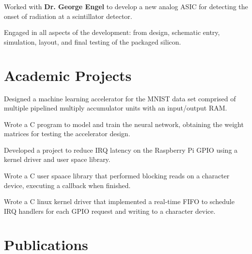 \documentclass[]{deedy-resume-openfont}
\begin{document}
\begin{minipage}[t]{0.66\textwidth}
\begin{tightemize}
\item Worked with \textbf{Dr. George Engel} to develop a new analog ASIC for detecting the onset of radiation at a scintillator detector. 
\item Engaged in all aspects of the development: from design, schematic entry, simulation, layout, and final testing of the packaged silicon. 
\end{tightemize}
\sectionsep


\section{Academic Projects}
\begin{tightemize}
\item Designed a machine learning accelerator for the MNIST data set comprised of multiple pipelined multiply accumulator units with an input/output RAM. 
\item Wrote a C program to model and train the neural network, obtaining the weight matrices for testing the accelerator design.
\end{tightemize}
\sectionsep

\begin{tightemize}
\item Developed a project to reduce IRQ latency on the Raspberry Pi GPIO using a kernel driver and user space library. 
\item Wrote a C user spaace library that performed blocking reads on a character device, executing a callback when finished.
\item Wrote a C linux kernel driver that implemented a real-time FIFO to schedule IRQ handlers for each GPIO request and writing to a character device.
\end{tightemize}
\sectionsep


\section{Publications} 
\renewcommand\refname{\vskip -1.5em} %


\nocite{*}

\end{minipage} 
\end{document}
